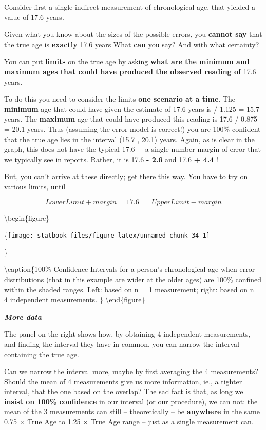 \documentclass[]{book}
\begin{document}
Consider first a single indirect measurement of chronological age, that yielded a value of 17.6 years.

Given what you know about the sizes of the possible errors, you \textbf{cannot say} that the true age is \textbf{exactly} 17.6 years What \textbf{can} you say? And with what certainty?

You can put \textbf{limits} on the true age by asking \textbf{what are the minimum and maximum ages that could have produced the observed reading of}
17.6 years.

To do this you need to consider the limits \textbf{one scenario at a time}. The \textbf{minimum} age that could have given the estimate of 17.6 years is /
1.125 =
15.7 years. The \textbf{maximum} age that could have produced this reading is
17.6 / 0.875 = 20.1 years. Thus (assuming the error model is correct!) you are 100\% confident that the true age lies in the interval (15.7 , 20.1) years. Again, as is clear in the graph, this does not have the typical
17.6 \(\pm\) a single-number margin of error that we typically see in reports. Rather, it is 17.6 \textbf{- 2.6} and 17.6 \textbf{+ 4.4} !

But, you can't arrive at these directly; get there this way. You have to try on various limits, until

\[ LowerLimit + margin  = 17.6 \ = \   UpperLimit - margin  \]

\textbackslash{}begin\{figure\}

\{\centering \texttt{[image: statbook\_files/figure-latex/unnamed-chunk-34-1]}

\}

\textbackslash{}caption\{100\% Confidence Intervals for a person's chronological age when error distributions (that in this example are wider at the older ages) are 100\% confined within the shaded ranges. Left: based on n = 1 measurement; right: based on n = 4 independent measurements. \}\label{fig:unnamed-chunk-34}
\textbackslash{}end\{figure\}

\textbf{\emph{More data}}

The panel on the right shows how, by obtaining 4 independent measurements, and finding the interval they have in common, you can narrow the interval containing the true age.

Can we narrow the interval more, maybe by first averaging the 4 measurements? Should the mean of 4 measurements give us more information, ie., a tighter interval, that the one based on the overlap? The sad fact is that, as long we \textbf{insist on 100\% confidence} in our interval (or our procedure), we can not: the mean of the 3 measurements can still -- theoretically -- be \textbf{anywhere} in the same 0.75 \(\times\) True Age to 1.25 \(\times\) True Age range -- just as a single measurement can.
\end{document}
